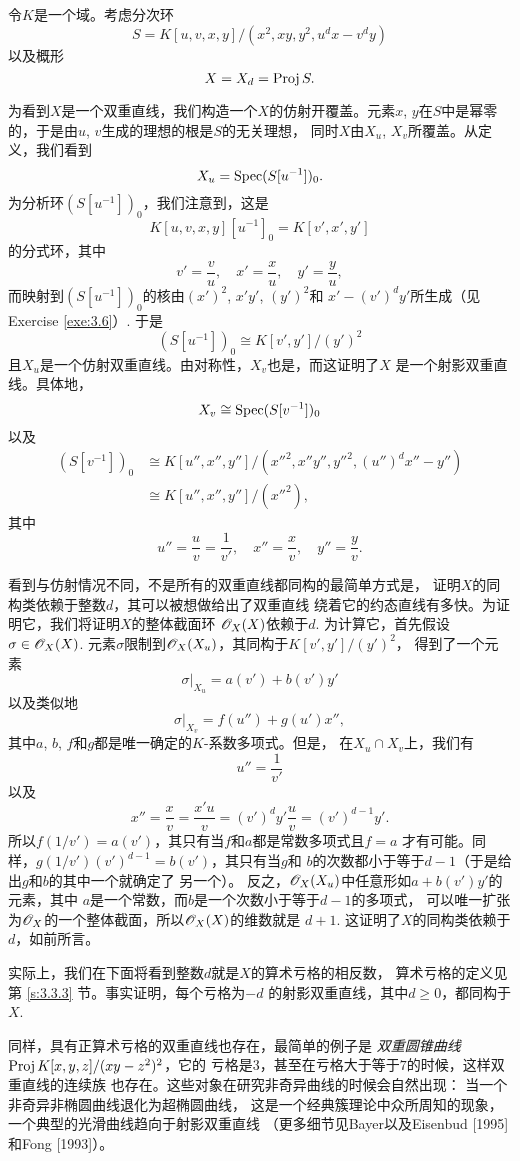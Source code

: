 令$K$是一个域。考虑分次环
\[
	S=K[u,v,x,y]/(x^2,xy,y^2,u^dx-v^dy)
\]
以及概形
\[
	X=X_d=\operatorname{Proj} S.
\]

为看到$X$是一个双重直线，我们构造一个$X$的仿射开覆盖。元素$x$,
$y$在$S$中是幂零的，于是由$u$, $v$生成的理想的根是$S$的无关理想，
同时$X$由$X_u$, $X_v$所覆盖。从定义，我们看到
\[
	X_u=\operatorname{Spec} (S[u^{-1}])_0.
\]%
为分析环$(S[u^{-1}])_0$，我们注意到，这是
\[
	K[u,v,x,y][u^{-1}]_0=K[v',x',y']
\]
的分式环，其中
\[
	v'=\frac vu,\quad x'=\frac xu,\quad y'=\frac yu,
\]
而映射到$(S[u^{-1}])_0$的核由$(x')^2$, $x'y'$, $(y')^2$和
$x'-(v')^dy'$所生成（见Exercise \ref{exe:3.6}）. 于是
\[
	(S[u^{-1}])_0\cong K[v',y']/(y')^2
\]
且$X_u$是一个仿射双重直线。由对称性，$X_v$也是，而这证明了$X$
是一个射影双重直线。具体地，
\[
	X_v\cong \operatorname{Spec} (S[v^{-1}])_0
\]
以及
\begin{align*}
(S[v^{-1}])_0{}&\cong K[u'',x'',y'']/({x''}^2,x''y'',{y''}^2,
(u'')^dx''-y'')\\
{}&\cong K[u'',x'',y'']/({x''}^2),
\end{align*}
其中
\[
	u''=\frac uv=\frac 1{v'},\quad x''=\frac xv,\quad 
	y''=\frac yv.
\]

看到与仿射情况不同，不是所有的双重直线都同构的最简单方式是，
证明$X$的同构类依赖于整数$d$，其可以被想做给出了双重直线
绕着它的约态直线有多快。为证明它，我们将证明$X$的整体截面环
$\mathscr{O}_X(X)$依赖于$d$. 为计算它，首先假设$\sigma\in \mathscr{O}_X(X)$.
元素$\sigma$限制到$\mathscr{O}_X(X_u)$，其同构于$K[v',y']/(y')^2$，
得到了一个元素
\[
	\sigma|_{X_u}=a(v')+b(v')y'
\]
以及类似地
\[
	\sigma|_{X_v}=f(u'')+g(u')x'',
\]
其中$a$, $b$, $f$和$g$都是唯一确定的$K$-系数多项式。但是，
在$X_u\cap X_v$上，我们有
\[
	u''=\frac 1{v'}
\]
以及
\[
	x''=\frac xv=\frac{x'u}v=(v')^d y'\frac uv=(v')^{d-1}y'.
\]
所以$f(1/v')=a(v')$，其只有当$f$和$a$都是常数多项式且$f=a$
才有可能。同样，$g(1/v')(v')^{d-1}=b(v')$，其只有当$g$和
$b$的次数都小于等于$d-1$（于是给出$g$和$b$的其中一个就确定了
另一个）。%
反之，$\mathscr{O}_X(X_u)$中任意形如$a+b(v')y'$的元素，其中
$a$是一个常数，而$b$是一个次数小于等于$d-1$的多项式，
可以唯一扩张为$\mathscr{O}_X$的一个整体截面，所以$\mathscr{O}_X(X)$的维数就是
$d+1$. 这证明了$X$的同构类依赖于$d$，如前所言。

实际上，我们在下面将看到整数$d$就是$X$的算术亏格的相反数，
算术亏格的定义见第 \ref{s:3.3.3} 节。事实证明，每个亏格为$-d$
的射影双重直线，其中$d\geq 0$，都同构于$X$.

同样，具有正算术亏格的双重直线也存在，最简单的例子是%
\textit{双重圆锥曲线} $\operatorname{Proj} K[x,y,z]/(xy-z^2)^2$，它的
亏格是$3$，甚至在亏格大于等于$7$的时候，这样双重直线的连续族
也存在。这些对象在研究非奇异曲线的时候会自然出现：
当一个非奇异非椭圆曲线退化为超椭圆曲线，
这是一个经典簇理论中众所周知的现象，
一个典型的光滑曲线趋向于射影双重直线
（更多细节见Bayer以及Eisenbud [1995]和Fong [1993]）。

